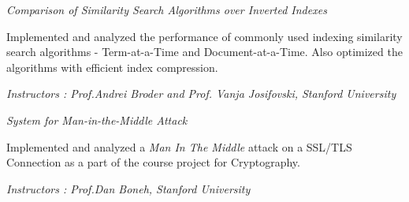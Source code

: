 \documentclass[10pt]{article}
\newcommand{\spc}{\vspace{1.2mm}}
\begin{document}
\textit{Comparison of Similarity Search Algorithms over Inverted Indexes}
\begin{compactitem}
\item {Implemented and analyzed the performance of commonly used indexing similarity search algorithms - Term-at-a-Time and Document-at-a-Time. Also optimized the algorithms  with efficient index compression.}
\item \emph{Instructors :  Prof.Andrei Broder and Prof. Vanja Josifovski, Stanford University}
\end{compactitem}
\spc


\textit{System for Man-in-the-Middle Attack}
\begin{compactitem}
\item {Implemented and analyzed a \textit{Man In The Middle} attack on a SSL/TLS Connection as a part of the course project for Cryptography.}
\item \emph{Instructors :  Prof.Dan Boneh, Stanford University}
\end{compactitem}
\spc


\end{document}
